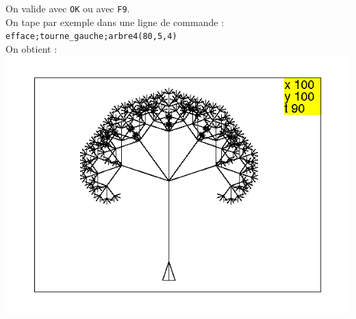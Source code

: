 \documentclass[a4paper,11pt]{book}
\begin{document}
On valide avec {\tt OK} ou avec {\tt F9}.\\
On tape par exemple dans une ligne de commande :\\
{\tt efface;tourne\_gauche;arbre4(80,5,4)}\\
On obtient :\\
\includegraphics[width=\textwidth]{tortarb4}\\
\end{document}
